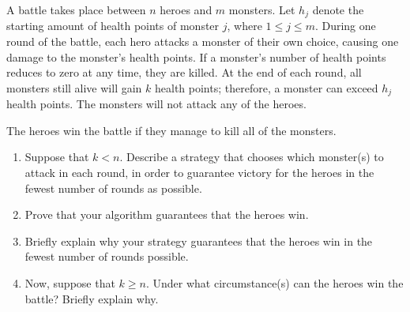 \documentclass{article}
\begin{document}
\begin{question}
A battle takes place between $n$ heroes and $m$ monsters. Let $h_j$ denote the starting amount of health points of monster $j$, where $1 \leq j \leq m$. During one round of the battle, each hero attacks a monster of their own choice, causing one damage to the monster's health points. If a monster's number of health points reduces to zero at any time, they are killed. At the end of each round, all monsters still alive will gain $k$ health points; therefore, a monster can exceed $h_j$ health points. The monsters will not attack any of the heroes.

The heroes win the battle if they manage to kill all of the monsters.

\begin{enumerate}[label = (\alph*)]
    \item Suppose that $k < n$. Describe a strategy that chooses which monster(s) to attack in each round, in order to guarantee victory for the heroes in the fewest number of rounds as possible.

    \item Prove that your algorithm guarantees that the heroes win.

    \item Briefly explain why your strategy guarantees that the heroes win in the fewest number of rounds possible.

    \item Now, suppose that $k \geq n$. Under what circumstance(s) can the heroes win the battle? Briefly explain why.
\end{enumerate}
\end{question}
\end{document}
